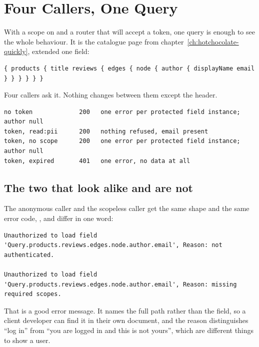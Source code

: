 \section{Four Callers, One Query}
\label{sec:ch15-four-callers-one-query}
%

With a scope on  and a router that will accept a token,
one query is enough to see the whole behaviour. It is the catalogue page from
chapter~\ref{ch:hotchocolate-quickly}, extended one field:

\begin{verbatim}
{ products { title reviews { edges { node { author { displayName email } } } } } }
\end{verbatim}

Four callers ask it. Nothing changes between them except the
 header.

\begin{verbatim}
no token             200   one error per protected field instance; author null
token, read:pii      200   nothing refused, email present
token, no scope      200   one error per protected field instance; author null
token, expired       401   one error, no data at all
\end{verbatim}

\subsection*{The two that look alike and are not}

%
The anonymous caller and the scopeless caller get the same shape and the same
error code, , and differ in one word:

\begin{verbatim}
Unauthorized to load field 'Query.products.reviews.edges.node.author.email', Reason: not authenticated.

Unauthorized to load field 'Query.products.reviews.edges.node.author.email', Reason: missing required scopes.
\end{verbatim}

That is a good error message. It names the full path rather than the field, so
a client developer can find it in their own document, and the reason
distinguishes \enquote{log in} from \enquote{you are logged in and this is not
yours}, which are different things to show a user.


